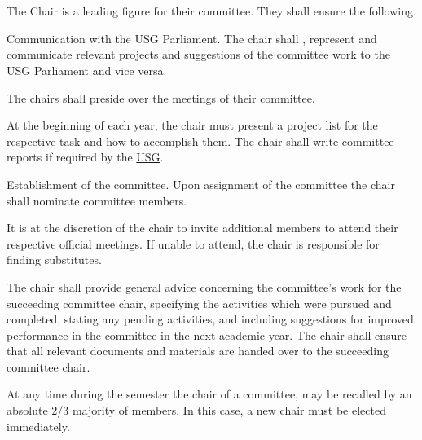 \section{}
The Chair is a leading figure for their committee. They shall ensure the following.
\begin{parenum}
\item Communication with the USG Parliament. The chair shall , represent and communicate relevant projects and suggestions of the committee work to the USG Parliament and vice versa. 

\item The chairs shall preside over the meetings of their committee.
\item At the beginning of each year, the chair must present a project list for the respective task and how to accomplish them. The chair shall write committee reports if required by the \hyperref[USGdef]{USG}.

\item Establishment of the committee. Upon assignment of the committee the chair shall nominate committee members. 

\item It is at the discretion of the chair to invite additional members to attend their respective official meetings. If unable to attend, the chair is responsible for finding substitutes.

\item The chair shall provide general advice concerning the committee's work for the succeeding committee chair, specifying the activities which were pursued and completed, stating any pending activities, and including suggestions for improved performance in the committee in the next academic year. The chair shall ensure that all relevant documents and materials are handed over to the succeeding committee chair. 
\item At any time during the semester the chair of a committee, may be recalled by an absolute 2/3 majority of members. In this case, a new chair must be elected immediately.
\end{parenum}



